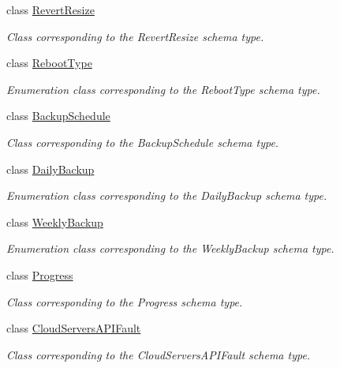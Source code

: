 \begin{DoxyCompactItemize}
class \hyperlink{classopenstack_1_1xml_1_1RevertResize}{RevertResize}
\begin{DoxyCompactList}\small\item\em Class corresponding to the RevertResize schema type. \item\end{DoxyCompactList}\item 
class \hyperlink{classopenstack_1_1xml_1_1RebootType}{RebootType}
\begin{DoxyCompactList}\small\item\em Enumeration class corresponding to the RebootType schema type. \item\end{DoxyCompactList}\item 
class \hyperlink{classopenstack_1_1xml_1_1BackupSchedule}{BackupSchedule}
\begin{DoxyCompactList}\small\item\em Class corresponding to the BackupSchedule schema type. \item\end{DoxyCompactList}\item 
class \hyperlink{classopenstack_1_1xml_1_1DailyBackup}{DailyBackup}
\begin{DoxyCompactList}\small\item\em Enumeration class corresponding to the DailyBackup schema type. \item\end{DoxyCompactList}\item 
class \hyperlink{classopenstack_1_1xml_1_1WeeklyBackup}{WeeklyBackup}
\begin{DoxyCompactList}\small\item\em Enumeration class corresponding to the WeeklyBackup schema type. \item\end{DoxyCompactList}\item 
class \hyperlink{classopenstack_1_1xml_1_1Progress}{Progress}
\begin{DoxyCompactList}\small\item\em Class corresponding to the Progress schema type. \item\end{DoxyCompactList}\item 
class \hyperlink{classopenstack_1_1xml_1_1CloudServersAPIFault}{CloudServersAPIFault}
\begin{DoxyCompactList}\small\item\em Class corresponding to the CloudServersAPIFault schema type. \item\end{DoxyCompactList}\item 

\end{DoxyCompactItemize}

